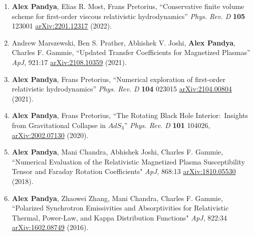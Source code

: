 \documentclass[margin,line,11pt]{resume}
\edef\hc{\string:} %
\begin{document}
\begin{resume}
\begin{enumerate}
\item \textbf{Alex Pandya}, Elias R. Most, Frans Pretorius, ``Conservative finite volume scheme for first-order viscous relativistic hydrodynamics'' \textit{Phys. Rev. D} \textbf{105} 123001 \href{https://arxiv.org/abs/2201.12317}{arXiv\hc2201.12317} (2022).
\vspace{2mm}

\item Andrew Marszewski, Ben S. Prather, Abhishek V. Joshi, \textbf{Alex Pandya}, Charles F. Gammie, ``Updated Transfer Coefficients for Magnetized Plasmas'' \textit{ApJ}, 921\hc17 \href{https://arxiv.org/abs/2108.10359}{arXiv\hc2108.10359} (2021). \vspace{2mm}

\item \textbf{Alex Pandya}, Frans Pretorius, ``Numerical exploration of first-order relativistic hydrodynamics'' \textit{Phys. Rev. D} \textbf{104} 023015 \href{https://arxiv.org/abs/2104.00804}{arXiv\hc2104.00804} (2021).
\vspace{2mm}

\item \textbf{Alex Pandya}, Frans Pretorius, ``The Rotating Black Hole Interior\hc\, Insights from Gravitational Collapse in $AdS_3$'' \textit{Phys. Rev. D} \textbf{101} 104026, \href{https://arxiv.org/abs/2002.07130}{arXiv\hc2002.07130} (2020).
\vspace{2mm}

\item \textbf{Alex Pandya}, Mani Chandra, Abhishek Joshi, Charles F. Gammie, ``Numerical Evaluation of the Relativistic Magnetized Plasma Susceptibility Tensor and Faraday Rotation Coefficients" \textit{ApJ}, 868\hc13 \href{https://arxiv.org/abs/1810.05530}{arXiv\hc1810.05530} (2018).
\vspace{2mm}

\item \textbf{Alex Pandya}, Zhaowei Zhang, Mani Chandra, Charles F. Gammie, ``Polarized Synchrotron Emissivities and Absorptivities for Relativistic Thermal, Power-Law, and Kappa Distribution Functions" \textit{ApJ}, 822\hc34 \href{https://arxiv.org/abs/1602.08749}{arXiv\hc1602.08749} (2016).
\end{enumerate}


\end{resume}
\end{document}
